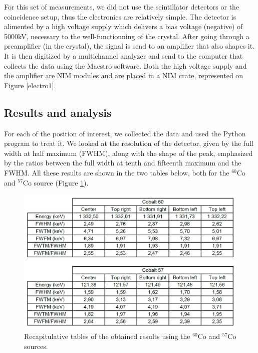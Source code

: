 \documentclass[11pt,a4paper]{article}
\begin{document}
For this set of measurements, we did not use the scintillator detectors or the coincidence setup, thus the electronics are relatively simple. The detector is alimented by a high voltage supply which delivers a bias voltage (negative) of 5000kV, necessary to the well-functionning of the crystal. After going through a preamplifier (in the crystal), the signal is send to an amplifier that also shapes it. It is then digitized by a multichannel analyzer and send to the computer that collects the data using the Maestro software. Both the high voltage supply and the amplifier are NIM modules and are placed in a NIM crate, represented on Figure \ref{electro1}.


\subsection{Results and analysis}

For each of the position of interest, we collected the data and used the Python program to treat it. We looked at the resolution of the detector, given by the full width at half maximum (FWHM), along with the shape of the peak, emphasized by the ratios between the full width at tenth and fifteenth maximum and the FWHM. All these results are shown in the two tables below, both for the $^{60}$Co and $^{57}$Co source (Figure \ref{recap}).

\begin{figure}[!h]
\centering
\includegraphics[scale=0.7]{Scan_Cos.png}
\caption{Recapitulative tables of the obtained results using the $^{60}$Co and $^{57}$Co sources.}
\label{recap}
\end{figure}
\end{document}

